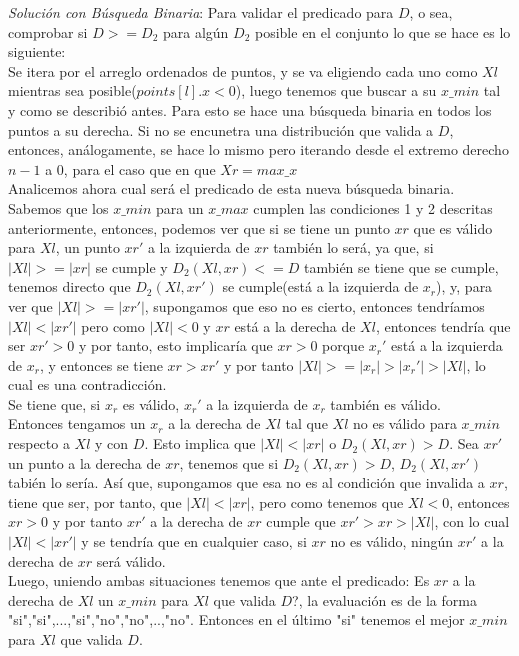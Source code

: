 \documentclass{article}
\begin{document}
\textit{Soluci\'on con B\'usqueda Binaria}: Para validar el predicado para $D$, o sea, comprobar si $D>=D_2$ para  alg\'un $D_2$ posible en el conjunto lo que se hace es lo siguiente:\\
Se itera por el arreglo ordenados de puntos, y se va eligiendo cada uno como  $Xl$ mientras sea posible($points[l].x<0$), luego tenemos que buscar a su $x\_min$ tal y como se describi\'o antes. Para esto se hace una b\'usqueda binaria en todos los puntos a su derecha. Si no se encunetra una distribuci\'on que valida a $D$, entonces, an\'alogamente, se hace lo mismo pero iterando desde el extremo derecho $n-1$ a $0$, para el caso que en que $Xr=max\_x$\\
Analicemos ahora cual ser\'a el predicado de esta nueva b\'usqueda binaria. Sabemos que los $x\_min$ para un $x\_max$ cumplen las condiciones 1 y 2 descritas anteriormente, entonces, podemos ver que si se tiene un punto $xr$ que es v\'alido para  $Xl$, un punto $xr'$ a la izquierda de $xr$ tambi\'en lo ser\'a, ya que, si $|Xl|>=|xr|$ se cumple y $D_2(Xl, xr)<=D$ tambi\'en se tiene que se cumple, tenemos directo que $D_2(Xl,xr')$ se cumple(est\'a a la izquierda de $x_r$), y, para ver que $|Xl|>=|xr'|$, supongamos que eso no es cierto, entonces tendr\'iamos $|Xl| < |xr'|$ pero como $|Xl|<0$ y $xr$ est\'a a la derecha de $Xl$, entonces tendr\'ia que ser $xr'>0$ y por tanto, esto implicar\'ia que $xr>0$ porque $x_r'$ est\'a a la izquierda de $x_r$, y entonces se tiene $xr>xr'$ y por tanto $|Xl|>=|x_r|>|x_r'|>|Xl|$, lo cual es una contradicci\'on.\\
Se tiene que, si $x_r$ es v\'alido, $x_r'$ a la izquierda de $x_r$ tambi\'en  es v\'alido.\\ 
Entonces tengamos un $x_r$ a la derecha de $Xl$ tal que $Xl$ no es v\'alido para $x\_min$ respecto a $Xl$ y con $D$. Esto implica que $|Xl| < |xr|$ o $D_2(Xl, xr)>D$. Sea $xr'$ un punto a la derecha de $xr$, tenemos que si $D_2(Xl, xr)>D$, $D_2(Xl, xr')$ tabi\'en lo ser\'ia. As\'i que, supongamos que esa no es al condici\'on que invalida a $xr$, tiene que ser, por tanto, que $|Xl|<|xr|$, pero como tenemos que $Xl<0$, entonces $xr>0$ y por tanto $xr'$ a la derecha de $xr$ cumple que $xr'>xr>|Xl|$, con lo cual $|Xl|<|xr'|$ y se tendr\'ia que en cualquier caso, si $xr$ no es v\'alido, ning\'un $xr'$ a la derecha de $xr$ ser\'a v\'alido.\\
Luego, uniendo ambas situaciones tenemos que ante el predicado: Es $xr$ a la derecha de $Xl$ un $x\_min$ para $Xl$ que valida $D$?, la evaluaci\'on es de la forma "si","si",...,"si","no","no",..,"no". Entonces en el \'ultimo "si" tenemos el mejor $x\_min$ para $Xl$ que valida $D$.\\
\end{document}
